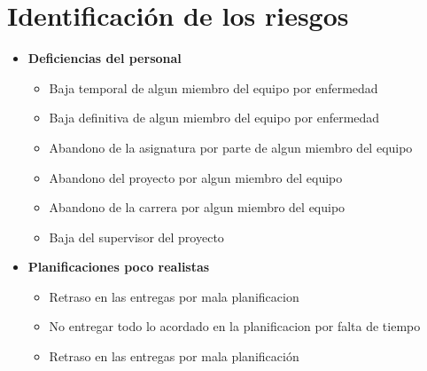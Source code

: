 \documentclass[spanish,a4paper,12pt]{report}	%
\begin{document}
\part{Identificación de los riesgos}
\begin{itemize}
\item \textbf {Deficiencias del personal}
	\begin{itemize}
		\item {Baja temporal de algun miembro del equipo por enfermedad}
		\item {Baja definitiva de algun miembro del equipo por enfermedad}
		\item {Abandono de la asignatura por parte de algun miembro del equipo}
		\item {Abandono del proyecto por algun miembro del equipo}
		\item {Abandono de la carrera por algun miembro del equipo}
		\item {Baja del supervisor del proyecto}
	\end{itemize}
\item \textbf {Planificaciones poco realistas}
	\begin{itemize}
		\item {Retraso en las entregas por mala planificacion}

		\item {No entregar todo lo acordado en la planificacion por falta de tiempo}
		\item {Retraso en las entregas por mala planificación}


\end{itemize}
\end{itemize}
\end{document}
